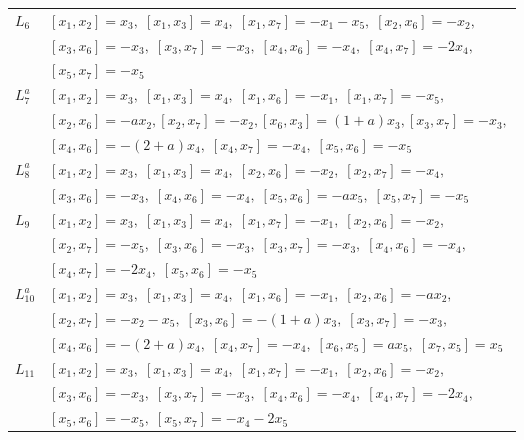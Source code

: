 \documentclass[11pt]{article}
\begin{document}
\begin{table}[htbp]
{\begin{tabular}{|p{1cm}|p{10.1cm}|}
$L_{6}$ &
$[x_{1},x_{2}] = x_{3},\;
 [x_{1},x_{3}]=x_{4},\;
 [x_{1},x_{7}]=-x_{1}-x_{5},\;
 [x_{2},x_{6}]=-x_{2},$\\
 &$
 [x_{3},x_{6}]=-x_{3},\;
 [x_{3},x_{7}]=-x_{3},\;
 [x_{4},x_{6}]=-x_{4},\;
 [x_{4},x_{7}]=-2x_{4},$\\
 &$
 [x_{5},x_{7}]=-x_{5}$ \\ \hline

$L_{7}^{a}$ &
$[x_{1},x_{2}]=x_{3},\;
 [x_{1},x_{3}] = x_{4},\;
 [x_{1},x_{6}] = -x_{1},\;
 [x_{1},x_{7}] = -x_{5},$\\
 &$
 [x_{2},x_{6}] = -a x_{2},
 [x_{2},x_{7}] = - x_{2},
 [x_{6},x_{3}] = (1+a)x_{3},
 [x_{3},x_{7}] = -x_{3},$\\
 &$
 [x_{4},x_{6}] = -(2+a)x_{4},\;
 [x_{4},x_{7}] = -x_{4},\;
 [x_{5},x_{6}] = -x_{5}$ \\ \hline

$L_{8}^{a}$ &
$[x_{1},x_{2}] = x_{3},\;
 [x_{1},x_{3}]=x_{4},\;
 [x_{2},x_{6}] = -x_{2},\;
 [x_{2},x_{7}] = -x_{4},$\\
 &$
 [x_{3},x_{6}] = -x_{3},\;
 [x_{4},x_{6}] = -x_{4},\;
 [x_{5},x_{6}] = -a x_{5},\;
 [x_{5},x_{7}] = -x_{5}$ \\ \hline

$L_{9}$ &
$[x_{1},x_{2}] = x_{3},\;
 [x_{1},x_{3}] = x_{4},\;
 [x_{1},x_{7}] = -x_{1},\;
 [x_{2},x_{6}] = -x_{2},$\\
 &$
 [x_{2},x_{7}] = -x_{5},\;
 [x_{3},x_{6}] = -x_{3},\;
 [x_{3},x_{7}] = -x_{3},\;
 [x_{4},x_{6}] = -x_{4},$\\
 &$
 [x_{4},x_{7}] = -2x_{4},\;
 [x_{5},x_{6}] = -x_{5}$ \\ \hline

$L_{10}^{a}$ &
$[x_{1},x_{2}] = x_{3},\;
 [x_{1},x_{3}] = x_{4},\;
 [x_{1},x_{6}] = -x_{1},\;
 [x_{2},x_{6}] = -ax_{2},$\\
 &$
 [x_{2},x_{7}] = -x_{2}-x_{5},\;
 [x_{3},x_{6}]=-(1+a)x_{3},\;
 [x_{3},x_{7}] = -x_{3},$\\
 &$
 [x_{4},x_{6}] = -(2+a)x_{4},\;
 [x_{4},x_{7}] = -x_{4},\;
 [x_{6},x_{5}] = ax_{5},\;
 [x_{7},x_{5}] = x_{5}$ \\ \hline

$L_{11}$ &
$[x_{1},x_{2}] = x_{3},\;
 [x_{1},x_{3}] = x_{4},\;
 [x_{1},x_{7}] = -x_{1},\;
 [x_{2},x_{6}] = -x_{2},$\\
 &$
 [x_{3},x_{6}] = -x_{3},\;
 [x_{3},x_{7}] = -x_{3},\;
 [x_{4},x_{6}] = -x_{4},\;
 [x_{4},x_{7}] = -2x_{4},$\\
 &$
 [x_{5},x_{6}] = -x_{5},\;
 [x_{5},x_{7}] = -x_{4}-2x_{5}$ \\ \hline


\end{tabular}}
\end{table}
\end{document}
